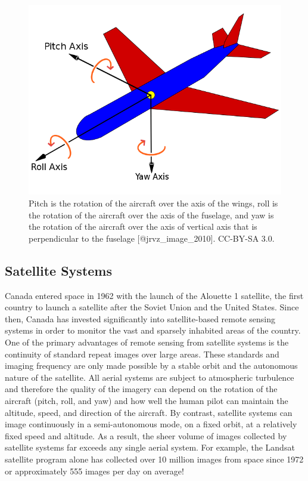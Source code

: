 \documentclass[
]{book}
\begin{document}
\begin{figure}
\includegraphics[width=0.9\linewidth]{images/12-pitch-roll-yaw} \caption{Pitch is the rotation of the aircraft over the axis of the wings, roll is the rotation of the aircraft over the axis of the fuselage, and yaw is the rotation of the aircraft over the axis of vertical axis that is perpendicular to the fuselage [@jrvz_image_2010]. CC-BY-SA 3.0.}\label{fig:12-pitch-roll-yaw}
\end{figure}

\subsection{Satellite Systems}\label{satellite-systems}

Canada entered space in 1962 with the launch of the Alouette 1 satellite, the first country to launch a satellite after the Soviet Union and the United States. Since then, Canada has invested significantly into satellite-based remote sensing systems in order to monitor the vast and sparsely inhabited areas of the country. One of the primary advantages of remote sensing from satellite systems is the continuity of standard repeat images over large areas. These standards and imaging frequency are only made possible by a stable orbit and the autonomous nature of the satellite. All aerial systems are subject to atmospheric turbulence and therefore the quality of the imagery can depend on the rotation of the aircraft (pitch, roll, and yaw) and how well the human pilot can maintain the altitude, speed, and direction of the aircraft. By contrast, satellite systems can image continuously in a semi-autonomous mode, on a fixed orbit, at a relatively fixed speed and altitude. As a result, the sheer volume of images collected by satellite systems far exceeds any single aerial system. For example, the Landsat satellite program alone has collected over 10 million images from space since 1972 or approximately 555 images per day on average!
\end{document}

